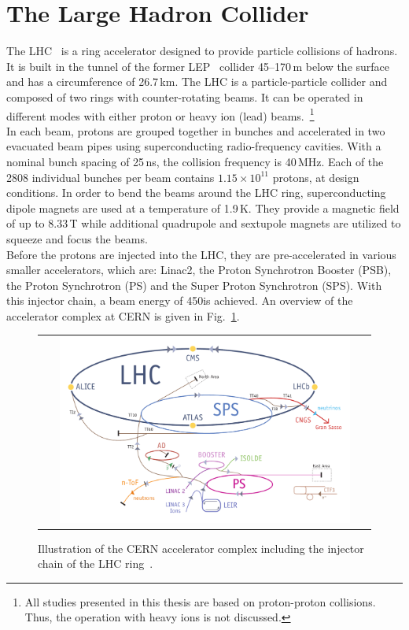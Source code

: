 \section{The Large Hadron Collider}
\label{sec:lhc}
The LHC~\cite{Bruning:782076, 1748-0221-3-08-S08001} is a ring accelerator designed to provide particle collisions of hadrons. It is built in the tunnel of the former LEP~\cite{LEPdesign} collider 45--170\,m below the surface and has a circumference of 26.7\,km. The LHC is a particle-particle collider and composed of two rings with counter-rotating beams. It can be operated in different modes with either proton or heavy ion (\eg lead) beams.~\footnote{All studies presented in this thesis are based on proton-proton collisions. Thus, the operation with heavy ions is not discussed.} \\
In each beam, protons are grouped together in bunches and accelerated in two evacuated beam pipes using superconducting radio-frequency cavities. With a nominal bunch spacing of 25\,ns, the collision frequency is 40\,MHz. Each of the 2808 individual bunches per beam contains $1.15 \times 10^{11}$ protons, at design conditions. In order to bend the beams around the LHC ring, superconducting dipole magnets are used at a temperature of 1.9\,K. They provide a magnetic field of up to 8.33\,T while additional quadrupole and sextupole magnets are utilized to squeeze and focus the beams.\\  
Before the protons are injected into the LHC, they are pre-accelerated in various smaller accelerators, which are: Linac2, the Proton Synchrotron Booster (PSB), the Proton Synchrotron (PS) and the Super Proton Synchrotron (SPS). With this injector chain, a beam energy of 450\gev is achieved. An overview of the accelerator complex at CERN is given in Fig.~\ref{fig:AccComplex}. 
\begin{figure}[!tp]
  \centering 
  \begin{tabular}{c}
    \includegraphics[width=0.9\textwidth]{figures/lhc.pdf}
  \end{tabular}
  \caption{Illustration of the CERN accelerator complex including the injector chain of the LHC ring~\cite{CERNaccelerators}.}
  \label{fig:AccComplex}
\end{figure}
